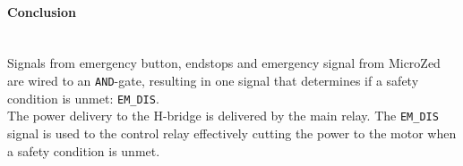 \paragraph{Conclusion}~\\
Signals from emergency button, endstops and emergency signal from MicroZed are wired to an \texttt{AND}-gate, resulting in one signal that determines if a safety condition is unmet: \texttt{EM\_DIS}.
\\
The power delivery to the H-bridge is delivered by the main relay.
The \texttt{EM\_DIS} signal is used to the control relay effectively cutting the power to the motor when a safety condition is unmet.

